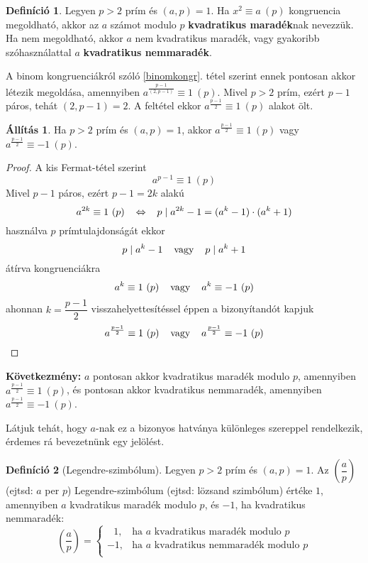 \documentclass[12pt]{book}
\theoremstyle{plain} %
\theoremstyle{definition} %
\newtheorem{defi/}{Definíció}[section]
\newenvironment{defi}
  {\renewcommand{\qedsymbol}{$\clubsuit$}%
   \pushQED{\qed}\begin{defi/}}
  {\popQED\end{defi/}}
\newtheorem{all/}{Állítás}[section]
\newenvironment{all}
{\renewcommand{\qedsymbol}{$\clubsuit$}%
	\pushQED{\qed}\begin{all/}}
	{\popQED\end{all/}}
\theoremstyle{remark}
\renewcommand\qedsymbol{$\blacksquare$}
\numberwithin{equation}{section}  %
\begin{document}
	\begin{defi}
		Legyen $p>2$ prím és $(a,p)=1$. Ha $x^2\equiv a\ (p)$ kongruencia megoldható, akkor az $a$ számot modulo $p$ \textbf{kvadratikus maradék}nak nevezzük. Ha nem megoldható, akkor $a$ nem kvadratikus maradék, vagy gyakoribb szóhasználattal $a$ \textbf{kvadratikus nemmaradék}.
	\end{defi}
	
	A binom kongruenciákról szóló \ref{binomkongr}. tétel szerint ennek pontosan akkor létezik megoldása, amennyiben $a^{\frac{p-1}{(2,p-1)}} \equiv 1\ (p)$. Mivel $p>2$ prím, ezért $p-1$ páros, tehát $(2,p-1)=2$. A feltétel ekkor $a^{\frac{p-1}{2}} \equiv 1\ (p)$ alakot ölt.
	
	\begin{all}
		Ha $p>2$ prím és $(a,p)=1$, akkor $a^{\frac{p-1}{2}} \equiv 1\ (p)$ vagy $a^{\frac{p-1}{2}} \equiv -1\ (p)$.
	\end{all}

	\begin{proof}
		A kis Fermat-tétel szerint
		\[ a^{p-1} \equiv 1\ (p)  \]
		Mivel $p-1$ páros, ezért $p-1=2k$ alakú
		\[ a^{2k} \equiv 1\ (p) \hspace{3mm} \Leftrightarrow \hspace{3mm} p\mid a^{2k} - 1 = (a^k-1)\cdot (a^k+1) \]
		használva $p$ prímtulajdonságát ekkor
		\[ p\mid a^k-1 \hspace{4mm} \text{vagy} \hspace{4mm} p\mid a^k+1  \]
		átírva kongruenciákra
		\[ a^k\equiv 1\ (p) \hspace{4mm} \text{vagy} \hspace{4mm} a^k\equiv -1\ (p)  \]
		ahonnan $k=\dfrac{p-1}{2}$ visszahelyettesítéssel éppen a bizonyítandót kapjuk
		\[ a^{\frac{p-1}{2}} \equiv 1\ (p) \hspace{4mm} \text{vagy} \hspace{4mm} a^{\frac{p-1}{2}} \equiv - 1\ (p)  \]
	\end{proof}

	\textbf{Következmény:} $a$ pontosan akkor kvadratikus maradék modulo $p$, amennyiben $a^{\frac{p-1}{2}}\equiv 1\ (p)$, és pontosan akkor kvadratikus nemmaradék, amennyiben $a^{\frac{p-1}{2}}\equiv -1\ (p)$.
	
	Látjuk tehát, hogy $a$-nak ez a bizonyos hatványa különleges szereppel rendelkezik, érdemes rá bevezetnünk egy jelölést.
	
	\begin{defi}[Legendre-szimbólum]
		Legyen $p>2$ prím és $(a,p)=1$. Az $\left(\dfrac{a}{p}\right)$ (ejtsd: $a$ per $p$) Legendre-szimbólum (ejtsd: lözsand szimbólum) értéke $1$, amennyiben $a$ kvadratikus maradék modulo $p$, és $-1$, ha kvadratikus nemmaradék:
		\[ \left(\dfrac{a}{p}\right) = \begin{cases}
		\ \ \ 1, & \text{ha $a$ kvadratikus maradék modulo $p$} \\
		-1, & \text{ha $a$ kvadratikus nemmaradék modulo $p$} \\
		\end{cases} \]
	\end{defi}
\end{document}
